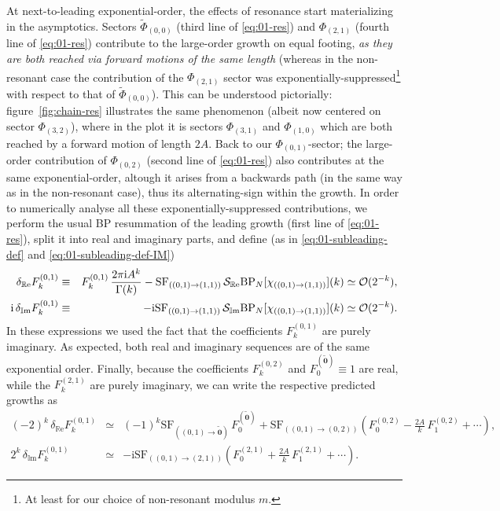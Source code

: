 \documentclass[11pt,a4paper]{article}
\newcommand{\CO}{{\cal O}}
\newcommand{\CS}{{\cal S}}
\def\im{{\mathbb{I}}{\mathrm{m}}}
\def\re{{\mathbb{R}}{\mathrm{e}}}
\begin{document}
At next-to-leading exponential-order, the effects of resonance start materializing in the asymptotics. Sectors $\widetilde{\Phi}_{(0,0)}$ (third line of \eqref{eq:01-res}) and $\Phi_{(2,1)}$ (fourth line of \eqref{eq:01-res}) contribute to the large-order growth on equal footing, \textit{as they are both reached via forward motions of the same length} (whereas in the non-resonant case the contribution of the $\Phi_{(2,1)}$ sector was exponentially-suppressed\footnote{At least for our choice of non-resonant modulus $m$.} with respect to that of $\widetilde{\Phi}_{(0,0)}$). This can be understood pictorially: figure~\ref{fig:chain-res} illustrates the same phenomenon (albeit now centered on sector $\Phi_{(3,2)}$), where in the plot it is sectors $\Phi_{(3,1)}$ and $\Phi_{(1,0)}$ which are both reached by a forward motion of length $2A$. Back to our $\Phi_{(0,1)}$-sector; the large-order contribution of $\Phi_{(0,2)}$ (second line of \eqref{eq:01-res}) also contributes at the same exponential-order, altough it arises from a backwards path (in the same way as in the non-resonant case), thus its alternating-sign within the growth. In order to numerically analyse all these exponentially-suppressed contributions, we perform the usual BP resummation of the leading growth (first line of \eqref{eq:01-res}), split it into real and imaginary parts, and define (as in \eqref{eq:01-subleading-def} and \eqref{eq:01-subleading-def-IM})
%
\begin{eqnarray}
\label{eq:res-01-subl-re}
\delta_{\re} F^{(0,1)}_k &\equiv& F_k^{(0,1)}\, \frac{2\pi\mathrm{i} A^{k}}{\Gamma(k)} - \mathrm{SF}_{( (0,1) \rightarrow (1,1) )}\, \CS_{\re} \mathrm{BP}_{N} [\chi_{( (0,1) \rightarrow (1,1) )}] (k) \simeq \CO (2^{-k}), \\
\label{eq:res-01-subl-im}
\mathrm{i}\, \delta_{\im} F^{(0,1)}_k &\equiv& - \mathrm{i} \mathrm{SF}_{( (0,1) \rightarrow (1,1) )}\, \CS_{\im} \mathrm{BP}_{N} [\chi_{( (0,1) \rightarrow (1,1) )}] (k) \simeq \CO (2^{-k}).
\end{eqnarray}
%
\noindent
In these expressions we used the fact that the coefficients $F_k^{(0,1)}$ are purely imaginary. As expected, both real and imaginary sequences are of the same exponential order. Finally, because the coefficients $F_k^{(0,2)}$ and $F_0^{(\widetilde{\boldsymbol{0}})} \equiv 1$ are real, while the $F_k^{(2,1)}$ are purely imaginary, we can write the respective predicted growths as
%
\begin{eqnarray}
(-2)^k\, \delta_{\re} F^{(0,1)}_k &\simeq& (-1)^k \mathrm{SF}_{( (0,1) \rightarrow \widetilde{\boldsymbol{0}} )}\, F_0^{(\widetilde{\boldsymbol{0}})} + \mathrm{SF}_{( (0,1) \rightarrow (0,2) )} \left( F_0^{(0,2)} - \frac{2A}{k}\, F_1^{(0,2)} + \cdots \right), \qquad \\
2^k\, \delta_{\im} F^{(0,1)}_k &\simeq& -\mathrm{i} \mathrm{SF}_{( (0,1) \rightarrow  (2,1) )} \left( F_0^{(2,1)} + \frac{2A}{k}\, F_1^{(2,1)} + \cdots \right).
\end{eqnarray}
\end{document}
